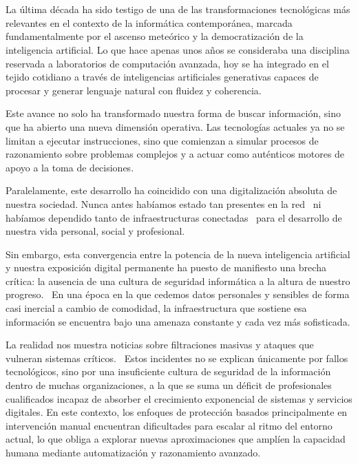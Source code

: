 \chapter{\introductionname}


La última década ha sido testigo de una de las transformaciones tecnológicas más relevantes en el contexto de la informática contemporánea, marcada fundamentalmente por el ascenso meteórico y la democratización de la inteligencia artificial. Lo que hace apenas unos años se consideraba una disciplina reservada a laboratorios de computación avanzada, hoy se ha integrado en el tejido cotidiano a través de inteligencias artificiales generativas capaces de procesar y generar lenguaje natural con fluidez y coherencia.

Este avance no solo ha transformado nuestra forma de buscar información, sino que ha abierto una nueva dimensión operativa. Las tecnologías actuales ya no se limitan a ejecutar instrucciones, sino que comienzan a simular procesos de razonamiento sobre problemas complejos y a actuar como auténticos motores de apoyo a la toma de decisiones.

Paralelamente, este desarrollo ha coincidido con una digitalización absoluta de nuestra sociedad. Nunca antes habíamos estado tan presentes en la red~\cite{10570411} ni habíamos dependido tanto de infraestructuras conectadas~\cite{10581001} para el desarrollo de nuestra vida personal, social y profesional.

Sin embargo, esta convergencia entre la potencia de la nueva inteligencia artificial y nuestra exposición digital permanente ha puesto de manifiesto una brecha crítica: la ausencia de una cultura de seguridad informática a la altura de nuestro progreso.~\cite{NIST_CSF_2024} En una época en la que cedemos datos personales y sensibles de forma casi inercial a cambio de comodidad, la infraestructura que sostiene esa información se encuentra bajo una amenaza constante y cada vez más sofisticada.

La realidad nos muestra noticias sobre filtraciones masivas y ataques que vulneran sistemas críticos.~\cite{2144753} Estos incidentes no se explican únicamente por fallos tecnológicos, sino por una insuficiente cultura de seguridad de la información dentro de muchas organizaciones, a la que se suma un déficit de profesionales cualificados incapaz de absorber el crecimiento exponencial de sistemas y servicios digitales. En este contexto, los enfoques de protección basados principalmente en intervención manual encuentran dificultades para escalar al ritmo del entorno actual, lo que obliga a explorar nuevas aproximaciones que amplíen la capacidad humana mediante automatización y razonamiento avanzado.


